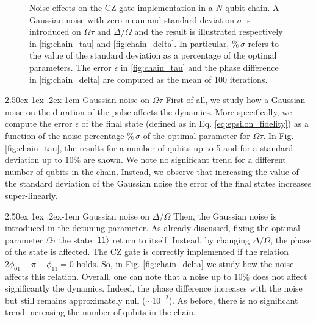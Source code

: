 \documentclass[rmp,10pt,onecolumn,fleqn,notitlepage]{revtex4-1}
\makeatletter
\renewcommand{\paragraph}{%
    \@startsection{paragraph}{4}%
    {\z@}{2.50ex \@plus 1ex \@minus .2ex}{-1em}%
    {\bf\sffamily}%
}
\makeatother
\begin{document}
\begin{figure}[H]
\begin{minipage}[]{0.49\linewidth}
\end{minipage}
\caption{Noise effects on the CZ gate implementation in a $N$-qubit chain. A Gaussian noise with zero mean and standard deviation $\sigma$ is introduced on $\Omega\tau$ and $\Delta/\Omega$ and the result is illustrated respectively in \ref{fig:chain_tau} and \ref{fig:chain_delta}. In particular, $\% \, \sigma$ refers to the value of the standard deviation as a percentage of the optimal parameters. 
The error $\epsilon$ in \ref{fig:chain_tau} and the phase difference in \ref{fig:chain_delta} are computed as the mean of 100 iterations.}
\label{fig:chain_results}
\end{figure}


\paragraph{Gaussian noise on $\Omega \tau$} First of all, we study how a Gaussian noise on the duration of the pulse affects the dynamics. More specifically, we compute the error $\epsilon$ of the final state (defined as in Eq. \eqref{eq:epsilon_fidelity}) as a function of the noise percentage $\% \, \sigma$ of the optimal parameter for $\Omega \tau$. In Fig. \ref{fig:chain_tau}, the results for a number of qubits up to 5 and for a standard deviation up to $10\%$ are shown. We note no significant trend for a different number of qubits in the chain. Instead, we observe that increasing the value of the standard deviation of the Gaussian noise the error of the final states increases super-linearly. 


\paragraph{Gaussian noise on $\Delta/\Omega$} Then, the Gaussian noise is introduced in the detuning parameter. As already discussed, fixing the optimal parameter $\Omega\tau$ the state $\left\vert{11}\right\rangle$ return to itself. Instead, by changing $\Delta/\Omega$, the phase of the state is affected. 
The CZ gate is correctly implemented if the relation $2 \phi_{01} - \pi - \phi_{11} = 0$ holds. So, in Fig. \ref{fig:chain_delta} we study how the noise affects this relation.
Overall, one can note that a noise up to $10\%$ does not affect significantly the dynamics. Indeed, the phase difference increases with the noise but still remains approximately null ($\sim 10^{-2}$). As before, there is no significant trend increasing the number of qubits in the chain. 
\end{document}

